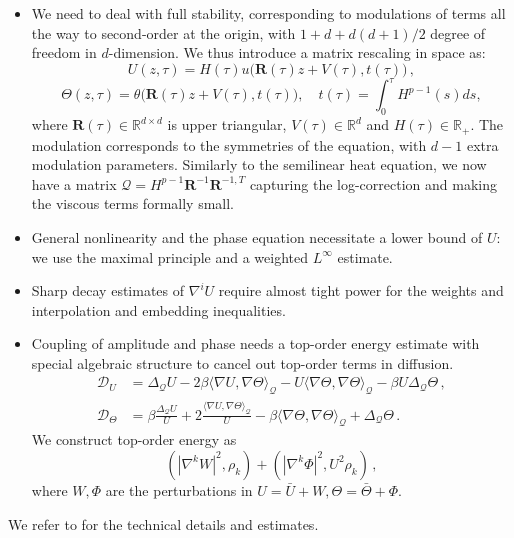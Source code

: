 \documentclass[12pt]{caltech_thesis}
\numberwithin{equation}{section}
\begin{document}
\begin{itemize}
\item We need to deal with full stability, corresponding to modulations of terms all the way to second-order at the origin, with $1+d+d(d+1)/2$ degree of freedom in $d$-dimension. We thus introduce a matrix rescaling in space as: $$U(z,\tau) = H(\tau) u\big( \mathbf{R}(\tau) z + V(\tau), t(\tau)\big)\,,$$$$\Theta(z, \tau) = 
 \theta\big( \mathbf{R}(\tau) z + V(\tau), t(\tau)\big), 
 \quad 
 t(\tau) = \int_0^\tau H^{p-1}(s) ds,
$$
where $ \mathbf{R}(\tau) \in \mathbb{R}^{d \times d}$ is upper triangular, $V(\tau) \in \mathbb{R}^d$ and $H(\tau) \in \mathbb{R}_+$.
 The modulation corresponds to the symmetries of the equation, with $d-1$ extra modulation parameters. Similarly to the semilinear heat equation, we now have a matrix $\mathcal{Q}=H^{p-1}\mathbf{R}^{-1}\mathbf{R}^{-1,T}$ capturing the log-correction and making the viscous terms formally small.

\item General nonlinearity and the phase equation necessitate a lower bound of $U$: we use the maximal principle and a weighted $L^\infty$ estimate.

\item Sharp decay estimates of $\nabla^i U$ require almost tight power for the weights and interpolation and embedding inequalities.

\item Coupling of amplitude and phase needs a top-order energy estimate with special algebraic structure to cancel out top-order terms in diffusion.
$$\begin{aligned}
    \mathscr{D}_U & =\Delta_\mathcal{Q} U-2\beta\langle\nabla U,\nabla\Theta\rangle_\mathcal{Q} -U\langle\nabla \Theta,\nabla\Theta\rangle_\mathcal{Q} -\beta U\Delta_\mathcal{Q} \Theta\,, \\
    \label{im_v1}
\mathscr{D}_\Theta & = \beta\frac{\Delta_\mathcal{Q}  U}{U}+2\frac{\langle\nabla U,\nabla\Theta\rangle_\mathcal{Q} }{U}-\beta \langle\nabla \Theta,\nabla\Theta\rangle_\mathcal{Q} +\Delta_\mathcal{Q} \Theta\,.
\end{aligned}$$
We construct top-order energy as 
$$(|\nabla^k W|^2,\rho_k)+(|\nabla^k \Phi|^2,U^2\rho_k)\,,$$
where $W,\Phi$ are the perturbations in $U=\bar{U}+W,\Theta=\bar{\Theta}+\Phi$.
 \end{itemize}
We refer to \cite{chen2024stability} for the technical details and estimates.
\end{document}
